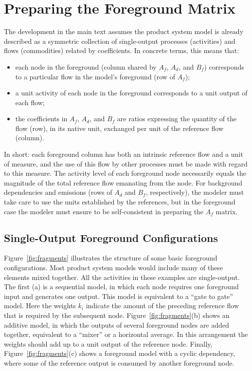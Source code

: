 \section{Preparing the Foreground Matrix}

The development in the main text assumes the product system model is already described as a symmetric collection of single-output processes (activities) and flows (commodities) related by coefficients.  In concrete terms, this means that:
\begin{itemize}
\item each node in the foreground (column shared by $A_f$, $A_d$, and $B_f$) corresponds to a particular flow in the model's foreground (row of $A_f$);
\item a unit activity of each node in the foreground corresponds to a unit output of each flow;
\item the coefficients in $A_f$, $A_d$, and $B_f$ are ratios expressing the quantity of the flow (row), in its native unit, exchanged per unit of the reference flow (column). 
\end{itemize}

In short: each foreground column has both an intrinsic reference flow and a unit of measure, and the use of this flow by other processes must be made with regard to this measure.  The activity level of each foreground node necessarily equals the magnitude of the total reference flow emanating from the node.  For background dependencies and emissions (rows of $A_d$ and $B_f$, respectively), the modeler must take care to use the units established by the references, but in the foreground case the modeler must ensure to be self-consistent in preparing the $A_f$ matrix. 


\subsection{Single-Output Foreground Configurations}



Figure~\ref{fig:fragments} illustrates the structure of some basic foreground configurations.  Most product system models would include many of these elements mixed together.  All the activities in these examples are single-output.
The first (a) is a sequential model, in which each node requires one foreground input and generates one output. This model is equivalent to a ``gate to gate'' model.  Here the weights $k_i$ indicate the amount of the preceding reference flow that is required by the subsequent node.  Figure~\ref{fig:fragments}(b) shows an additive model, in which the outputs of several foreground nodes are added together, equivalent to a ``mixer'' or a horizontal average.  In this arrangement the weights %
should add up to a unit output of the reference node.  Finally, Figure~\ref{fig:fragments}(c) shows a foreground model with a cyclic dependency, where some of the reference output is consumed by another foreground node.

